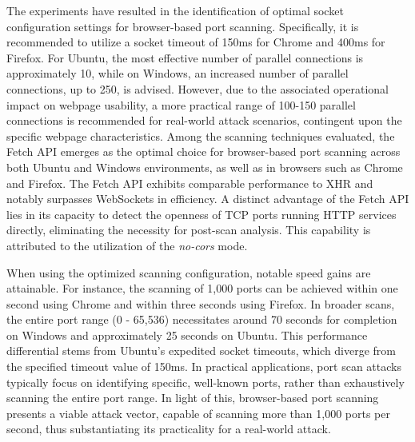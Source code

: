 The experiments have resulted in the identification of optimal socket configuration settings for browser-based port scanning. Specifically, it is recommended to utilize a socket timeout of 150ms for Chrome and 400ms for Firefox. For Ubuntu, the most effective number of parallel connections is approximately 10, while on Windows, an increased number of parallel connections, up to 250, is advised. However, due to the associated operational impact on webpage usability, a more practical range of 100-150 parallel connections is recommended for real-world attack scenarios, contingent upon the specific webpage characteristics. 
Among the scanning techniques evaluated, the Fetch API emerges as the optimal choice for browser-based port scanning across both Ubuntu and Windows environments, as well as in browsers such as Chrome and Firefox. The Fetch API exhibits comparable performance to XHR and notably surpasses WebSockets in efficiency. A distinct advantage of the Fetch API lies in its capacity to detect the openness of TCP ports running HTTP services directly, eliminating the necessity for post-scan analysis. This capability is attributed to the utilization of the \emph{no-cors} mode.

When using the optimized scanning configuration, notable speed gains are attainable. For instance, the scanning of 1,000 ports can be achieved within one second using Chrome and within three seconds using Firefox. In broader scans, the entire port range (0 - 65,536) necessitates around 70 seconds for completion on Windows and approximately 25 seconds on Ubuntu. This performance differential stems from Ubuntu's expedited socket timeouts, which diverge from the specified timeout value of 150ms.
In practical applications, port scan attacks typically focus on identifying specific, well-known ports, rather than exhaustively scanning the entire port range. In light of this, browser-based port scanning presents a viable attack vector, capable of scanning more than 1,000 ports per second, thus substantiating its practicality for a real-world attack.






